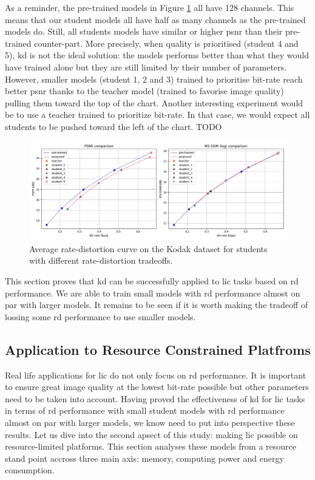 As a reminder, the pre-trained models in Figure \ref{kd_lic_4} all have 128 channels. This means that our student models all have half as many channels as the pre-trained models do. Still, all students models have similar or higher \acrshort{psnr} than their pre-trained counter-part. More precisely, when quality is prioritised (student 4 and 5), \acrshort{kd} is not the ideal solution: the models performs better than what they would have trained alone but they are still limited by their number of parameters. However, smaller models (student 1, 2 and 3) trained to prioritise bit-rate reach better \acrshort{psnr} thanks to the teacher model (trained to favorise image quality) pulling them toward the top of the chart. Another interesting experiment would be to use a teacher trained to prioritize bit-rate. In that case, we would expect all students to be pushed toward the left of the chart. TODO

\begin{figure}
    \centering
    \includegraphics[width=15cm]{img/kd_lic_4.png}
    \caption[Average rate-distortion curve on the Kodak dataset for students with different rate-distortion tradeoffs.]{Average rate-distortion curve on the Kodak dataset for students with different rate-distortion tradeoffs.}
    \label{kd_lic_4}
\end{figure}

This section proves that \acrshort{kd} can be successfully applied to \acrshort{lic} tasks based on \acrshort{rd} performance. We are able to train small models with \acrshort{rd} performance almost on par with larger models. It remains to be seen if it is worth making the tradeoff of lossing some \acrshort{rd} performance to use smaller models.

\subsection{Application to Resource Constrained Platfroms}
Real life applications for \acrshort{lic} do not only focus on \acrshort{rd} performance. It is important to ensure great image quality at the lowest bit-rate possible but other parameters need to be taken into account. Having proved the effectiveness of \acrshort{kd} for \acrshort{lic} tasks in terms of \acrshort{rd} performance with small student models with \acrshort{rd} performance almost on par with larger models, we know need to put into perspective these results. Let us dive into the second apsect of this study: making \acrshort{lic} possible on resource-limited platforms. This section analyses these models from a resource stand point accross three main axis: memory, computing power and energy consumption.

